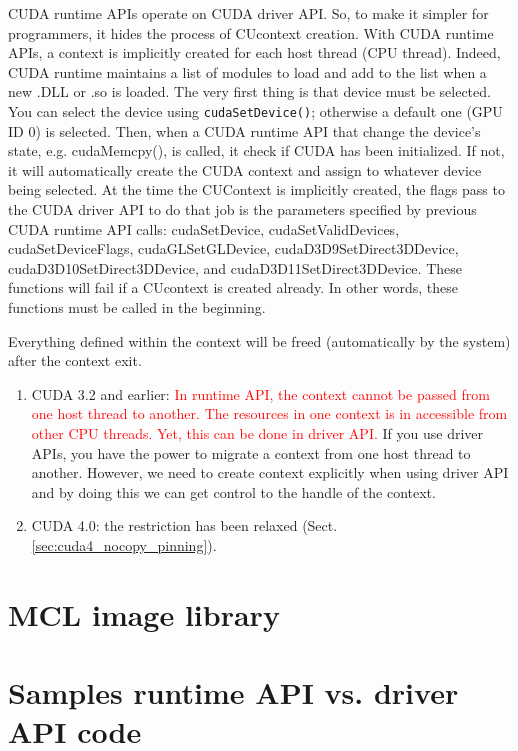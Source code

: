 CUDA runtime APIs operate on CUDA driver API. So, to make it simpler for
programmers, it hides the process of CUcontext creation. With CUDA runtime APIs,
a context is implicitly created for each host thread (CPU thread). Indeed, CUDA
runtime maintains a list of modules to load and add to the list when a new .DLL
or .so is loaded. The very first thing is that device must be selected. You can
select the device using \verb!cudaSetDevice()!; otherwise a default one (GPU ID
0) is selected. Then, when a CUDA runtime API that change the device's state,
e.g. cudaMemcpy(), is called, it check if CUDA has been initialized. If not, it
will automatically create the CUDA context and assign to whatever device being
selected. At the time the CUContext is implicitly created, the flags pass to the
CUDA driver API to do that job is the parameters specified by previous CUDA
runtime API calls: cudaSetDevice, cudaSetValidDevices, cudaSetDeviceFlags,
cudaGLSetGLDevice, cudaD3D9SetDirect3DDevice, cudaD3D10SetDirect3DDevice, and
cudaD3D11SetDirect3DDevice. These functions will fail if a CUcontext is created
already. In other words, these functions must be called in the beginning. 








Everything defined within the context will be freed (automatically
by the system) after the context exit.
\begin{enumerate}
  \item CUDA 3.2 and earlier: \textcolor{red}{In runtime API, the context cannot
  be passed from one host thread to another. The resources in one context is
  in accessible from other CPU threads. Yet, this can be done in driver API.}
  If you use driver APIs, you have the power to migrate a context from one host thread to another. However, we need to create context explicitly when using driver API and by doing this we can get control to the
handle of the context.
   
   \item CUDA 4.0: the restriction has been relaxed
   (Sect.\ref{sec:cuda4_nocopy_pinning}).
\end{enumerate}



\section{MCL image library}
\label{sec:mcl-image-library}


\section{Samples runtime API vs. driver API code}
\label{sec:sample_code}



